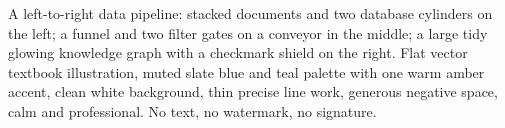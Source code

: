 A left-to-right data pipeline: stacked documents and two database cylinders on the left; a funnel and two filter gates on a conveyor in the middle; a large tidy glowing knowledge graph with a checkmark shield on the right. Flat vector textbook illustration, muted slate blue and teal palette with one warm amber accent, clean white background, thin precise line work, generous negative space, calm and professional. No text, no watermark, no signature.
